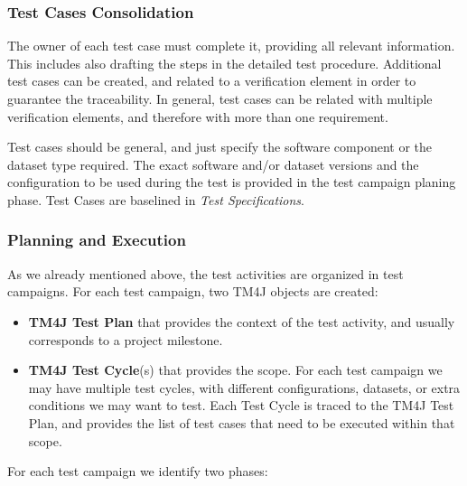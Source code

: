 \subsubsection{Test Cases Consolidation}

The owner of each test case must complete it, providing all relevant information.
This includes also drafting the steps in the detailed test procedure.
Additional test cases can be created, and related to a verification element in order to guarantee the traceability.
In general, test cases can be related with multiple verification elements, and therefore with more than one requirement.

Test cases should be general, and just specify the software component or the dataset type required.
The exact software and/or dataset versions and the configuration to be used during the test
is provided in the test campaign planing phase.
Test Cases are baselined in \textit{Test Specifications}.

\subsubsection{Planning and Execution}

As we already mentioned above, the test activities are organized in test campaigns.
For each test campaign, two TM4J objects are created:

\begin{itemize}
\item \textbf{TM4J Test Plan} that provides the context of the test activity, and usually corresponds to a project milestone.
\item \textbf{TM4J Test Cycle}(s) that provides the scope. For each test campaign we may have multiple test cycles,
with different configurations, datasets, or extra conditions we may want to test. Each Test Cycle is traced
to the TM4J Test Plan, and provides the list of test cases that need to be executed within that scope.
\end{itemize}

For each test campaign we identify two phases:


